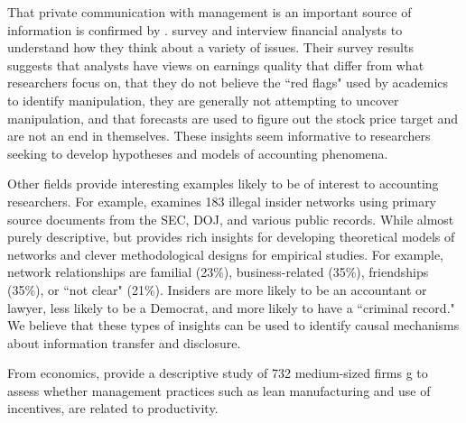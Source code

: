 \documentclass[11pt,reqno]{amsart}
\begin{document}
\begin{doublespace}
That private communication with management is an important source of information is confirmed by  \citet{Brown:2015kd}. \citet{Brown:2015kd} survey and interview financial analysts to understand how they think about a variety of issues.
Their survey results suggests that analysts have views on earnings quality that differ from what researchers focus on, that they do not believe the ``red flags" used by academics to identify manipulation, they are generally not attempting to uncover manipulation, and that forecasts are used to figure out the stock price target and are not an end in themselves.
These insights seem informative to researchers seeking to develop hypotheses and models of accounting phenomena.





Other fields provide interesting examples likely to be of interest to accounting researchers.
For example, \citet{Ahern:2014id} examines 183 illegal insider networks using primary source documents from the SEC, DOJ, and various public records. 
While almost purely descriptive, but provides rich insights for developing theoretical models of networks and clever methodological designs for empirical studies.
For example, network relationships are familial (23\%), business-related (35\%), friendships (35\%), or ``not clear" (21\%).
Insiders are more likely to be an accountant or lawyer, less likely to be a Democrat, and more likely to have a ``criminal record."
We believe that these types of insights can be used to identify causal mechanisms about information transfer and disclosure.

From economics, \citet{Bloom:2007ed} provide a descriptive study of 732 medium-sized firms g to assess whether management practices such as lean manufacturing and use of incentives, are related to productivity. 




\end{doublespace}
\end{document}
